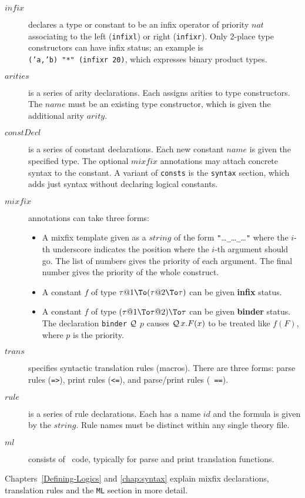 \begin{description}
\item[$infix$]
  declares a type or constant to be an infix operator of priority $nat$
  associating to the left ({\tt infixl}) or right ({\tt infixr}). Only
  2-place type constructors can have infix status; an example is {\tt
  ('a,'b)~"*"~(infixr~20)}, which expresses binary product types.

\item[$arities$]
  is a series of arity declarations.  Each assigns arities to type
  constructors.  The $name$ must be an existing type constructor, which is
  given the additional arity $arity$.

\item[$constDecl$]
  is a series of constant declarations.  Each new constant $name$ is given
  the specified type.  The optional $mixfix$ annotations may
  attach concrete syntax to the constant. A variant of {\tt consts} is the
  {\tt syntax} section, which adds just syntax without
  declaring logical constants.

\item[$mixfix$] 
  annotations can take three forms:
  \begin{itemize}
  \item A mixfix template given as a $string$ of the form
    {\tt"}\dots{\tt\_}\dots{\tt\_}\dots{\tt"} where the $i$-th underscore
    indicates the position where the $i$-th argument should go.  The list
    of numbers gives the priority of each argument.  The final number gives
    the priority of the whole construct.

  \item A constant $f$ of type $\tau@1\To(\tau@2\To\tau)$ can be given {\bf
    infix} status.

  \item A constant $f$ of type $(\tau@1\To\tau@2)\To\tau$ can be given {\bf
    binder} status.  The declaration {\tt binder} $\cal Q$ $p$ causes
  ${\cal Q}\,x.F(x)$ to be treated
  like $f(F)$, where $p$ is the priority.
  \end{itemize}

\item[$trans$]
  specifies syntactic translation rules (macros).  There are three forms:
  parse rules ({\tt =>}), print rules ({\tt <=}), and parse/print rules ({\tt
  ==}).

\item[$rule$]
  is a series of rule declarations.  Each has a name $id$ and the formula is
  given by the $string$.  Rule names must be distinct within any single
  theory file.

\item[$ml$] 
  consists of \ML\ code, typically for parse and print translation functions.
\end{description}
%
Chapters~\ref{Defining-Logics} and \ref{chap:syntax} explain mixfix
declarations, translation rules and the {\tt ML} section in more detail.


